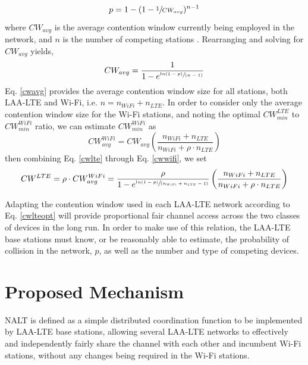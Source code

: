 \begin{equation}\label{pcollision}
p = 1-(1-\sfrac{1}{CW_{avg}})^{n-1}
\end{equation}
where $CW_{avg}$ is the average contention window currently being employed in the network, and $n$ is the number of competing stations \cite{vu}.  Rearranging and solving for $CW_{avg}$ yields,
\begin{equation}\label{cwavg}
CW_{avg} = \frac{1}{1-e^{ \sfrac{ln(1-p)}{(n-1)} }}
\end{equation}
Eq. \ref{cwavg} provides the average contention window size for all stations, both LAA-LTE and Wi-Fi, i.e. $n = n_{WiFi} + n_{LTE}$.  In order to consider only the average contention window size for the \mbox{Wi-Fi} stations, and noting the optimal $CW^{LTE}_{min}$ to $CW^{WiFi}_{min}$ ratio, we can estimate $CW^{WiFi}_{min}$ as
\begin{equation}\label{cwwifi}
CW^{WiFi}_{avg} = CW_{avg}\left ( \frac{n_{WiFi} + n_{LTE}}{n_{WiFi} + \rho\cdot n_{LTE}} \right )
\end{equation}
then combining Eq. \ref{cwlte} through Eq. \ref{cwwifi},  we set 
\begin{equation}\label{cwlteopt}
CW^{LTE} = \rho \cdot{CW^{WiFi}_{avg}} = \frac{\rho}{1-e^{ \sfrac{ln(1-p)}{(n_{WiFi} + n_{LTE}-1)} }}\left ( \frac{n_{WiFi} + n_{LTE}}{n_{WiFi} + \rho\cdot n_{LTE}} \right )
\end{equation}

Adapting the contention window used in each LAA-LTE network according to Eq. \ref{cwlteopt} will provide proportional fair channel access across the two classes of devices in the long run.  In order to make use of this relation, the LAA-LTE base stations must know, or be reasonably able to estimate, the probability of collision in the network, $p$, as well as the number and type of competing devices.  

\section{Proposed Mechanism}
\label{proposed}
NALT is defined as a simple distributed coordination function to be implemented by LAA-LTE base stations, allowing several LAA-LTE networks to effectively and independently fairly share the channel with each other and incumbent Wi-Fi stations, without any changes being required in the Wi-Fi stations.

